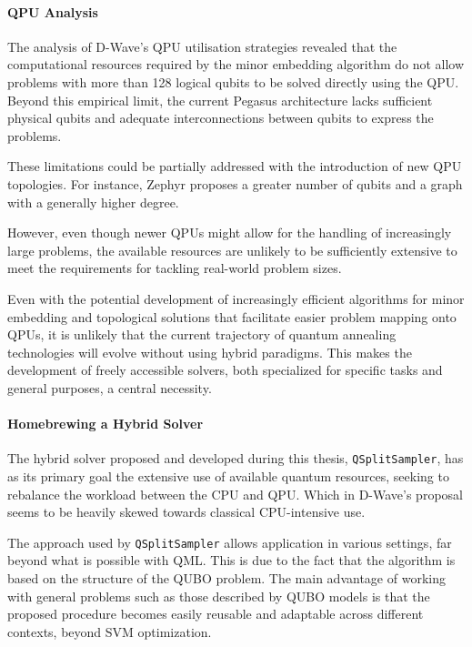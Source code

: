 \paragraph{QPU Analysis} The analysis of D-Wave's QPU utilisation strategies revealed that the computational resources required by the minor embedding algorithm do not allow problems with more than 128 logical qubits to be solved directly using the QPU. 
Beyond this empirical limit, the current Pegasus architecture lacks sufficient physical qubits and adequate interconnections between qubits to express the problems.

These limitations could be partially addressed with the introduction of new QPU topologies. 
For instance, Zephyr proposes a greater number of qubits and a graph with a generally higher degree.

However, even though newer QPUs might allow for the handling of increasingly large problems, the available resources are unlikely to be sufficiently extensive to meet the requirements for tackling real-world problem sizes. 

Even with the potential development of increasingly efficient algorithms for minor embedding and topological solutions that facilitate easier problem mapping onto QPUs, it is unlikely that the current trajectory of quantum annealing technologies will evolve without using hybrid paradigms. 
This makes the development of freely accessible solvers, both specialized for specific tasks and general purposes, a central necessity.

\paragraph{Homebrewing a Hybrid Solver} The hybrid solver proposed and developed during this thesis, \texttt{QSplitSampler}, has as its primary goal the extensive use of available quantum resources, seeking to rebalance the workload between the CPU and QPU.
Which in D-Wave's proposal seems to be heavily skewed towards classical CPU-intensive use.

The approach used by \texttt{QSplitSampler} allows application in various settings, far beyond what is possible with QML. 
This is due to the fact that the algorithm is based on the structure of the QUBO problem.
The main advantage of working with general problems such as those described by QUBO models is that the proposed procedure becomes easily reusable and adaptable across different contexts, beyond SVM optimization.


